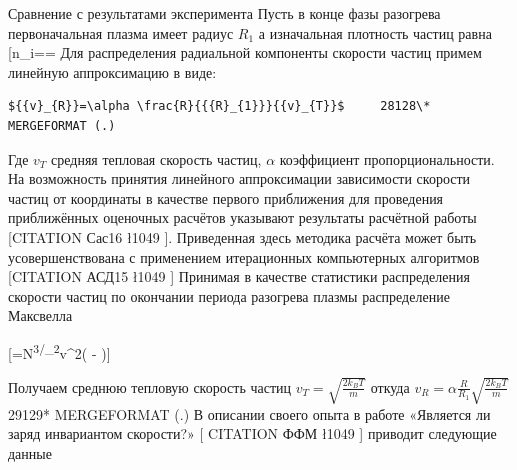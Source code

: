 \documentclass[11pt]{article}
\begin{document}
Сравнение с результатами эксперимента Пусть в конце фазы разогрева
первоначальная плазма имеет радиус \({{R}_{1}}\) а изначальная плотность
частиц равна
{[}{{n}\_{i}}==\frac{3{{N}_{i}}}{4\pi {{R}_{1}}^{3}}{]}
Для распределения радиальной компоненты скорости частиц примем линейную
аппроксимацию в виде:

\begin{verbatim}
${{v}_{R}}=\alpha \frac{R}{{{R}_{1}}}{{v}_{T}}$     28128\* MERGEFORMAT (.)
\end{verbatim}

Где \({{v}_{T}}\) средняя тепловая скорость частиц, $\alpha $
коэффициент пропорциональности. На возможность принятия линейного
аппроксимации зависимости скорости частиц от координаты в качестве
первого приближения для проведения приближённых оценочных расчётов
указывают результаты расчётной работы {[}CITATION Сас16 \l 1049 {]}.
Приведенная здесь методика расчёта может быть усовершенствована с
применением итерационных компьютерных алгоритмов {[}CITATION АСД15
\l 1049 {]} Принимая в качестве статистики распределения скорости частиц
по окончании периода разогрева плазмы распределение Максвелла

{[}=N{{}\textsuperscript{{{}}{3}/{}\_{2}}}{{v}^{2}}\exp \left(
- \right){]}

Получаем среднюю тепловую скорость частиц
\({{v}_{T}}=\sqrt{\frac{2{{k}_{B}}T}{m}}\) откуда
\({{v}_{R}}=\alpha \frac{R}{{{R}_{1}}}\sqrt{\frac{2{{k}_{B}}T}{m}}\)
29129* MERGEFORMAT (.) В описании своего опыта в работе «Является ли
заряд инвариантом скорости?» {[} CITATION ФФМ \l 1049 {]} приводит
следующие данные
\end{document}
